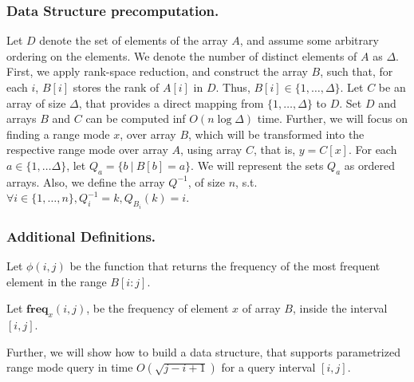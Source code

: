 \documentclass[runningheads]{llncs}
\begin{document}
\subsubsection{Data Structure precomputation.} Let $D$ denote the set of elements of the array $A$, and assume some arbitrary ordering on the elements. 
We denote the number of distinct elements of $A$ as $\Delta$. First, we apply rank-space reduction, and 
construct the array $B$, such that, for each $i$, $B[i]$ stores the rank of $A[i]$ in $D$. Thus, $B[i]\in \{1,\dots, \Delta\}$.
Let $C$ be an array of size $\Delta$, that provides a direct mapping from $\{1,\dots,\Delta\}$ to $D$. Set $D$ and arrays $B$ and $C$
can be computed inf $O(n \log\Delta )$ time. Further, we will focus on finding a range mode $x$, over array $B$, which will be transformed into the 
respective range mode over array $A$, using array $C$, that is, $y=C[x]$.
For each $a\in \{1,\dots \Delta\}$, let $Q_a = \{ b\ |\ B[b]=a  \} $. We will represent the sets $Q_a$ as ordered arrays. Also, we define the array $Q^{-1}$, of size $n$, s.t. $\forall i \in \{1,\dots ,n\}, Q^{-1}_i=k, Q_{B_i}(k)=i$.



\subsubsection{Additional Definitions.}
Let $\phi(i,j)$ be the function that returns the frequency of the most frequent element in the range $B[i:j]$.

Let $\textbf{freq}_x(i,j)$, be the frequency of element $x$ of array $B$, inside the interval $[i,j]$.


Further, we will show how to build a data structure, that supports parametrized range mode query in time $O(\sqrt{j-i+1})$ for a query interval
$[i,j]$.
\end{document}
